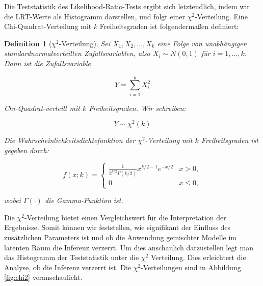 \documentclass[%
thesis=student,%
coverpage=false,%
titlepage=false,%
headmarks=true, %
german,%
font=libertine, %
math=newpxtx, %
BCOR=5mm,%
coverBCOR=11mm%
]{tumbook}
\theoremstyle{break}
\newtheorem{definition}{Definition}[section]
\begin{document}
Die Teststatistik des Likelihood-Ratio-Tests ergibt sich letztendlich, indem wir die LRT-Werte als Histogramm darstellen, und folgt einer $\chi^2$-Verteilung. Eine Chi-Quadrat-Verteilung mit $k$ Freiheitsgraden ist folgendermaßen definiert:
\begin{definition}[$\chi^2$-Verteilung]
	Sei \( X_1, X_2, \ldots, X_k \) eine Folge von unabhängigen standardnormalverteilten Zufallsvariablen, also \( X_i \sim N(0, 1) \) für \( i = 1, \ldots, k \). Dann ist die Zufallsvariable 
	
	\[
	Y = \sum_{i=1}^{k} X_i^2
	\]
	
	Chi-Quadrat-verteilt mit \( k \) Freiheitsgraden. Wir schreiben:
	
	\[
	Y \sim \chi^2(k)
	\]
	
	Die Wahrscheinlichkeitsdichtefunktion der $\chi^2$-Verteilung mit \( k \) Freiheitsgraden ist gegeben durch:
	
	\[
	f(x; k) = \begin{cases} 
		\frac{1}{2^{k/2} \Gamma(k/2)} x^{k/2 - 1} e^{-x/2} & x > 0, \\
		0 & x \le 0,
	\end{cases}
	\]
	
	wobei \( \Gamma(\cdot) \) die Gamma-Funktion ist.
\end{definition} \noindent
Die $\chi^2$-Verteilung bietet einen Vergleichswert für die Interpretation der Ergebnisse. Somit können wir feststellen, wie signifikant der Einfluss des zusätzlichen Parameters ist und ob die Anwendung gemischter Modelle im latenten Raum die Inferenz verzerrt. Um dies anschaulich darzustellen legt man das Histogramm der Teststatistik unter die $\chi^2$ Verteilung. Dies erleichtert die Analyse, ob die Inferenz verzerrt ist. Die $\chi^2$-Verteilungen sind in Abbildung \ref{fig:chi2} veranschaulicht.\\
\end{document}
